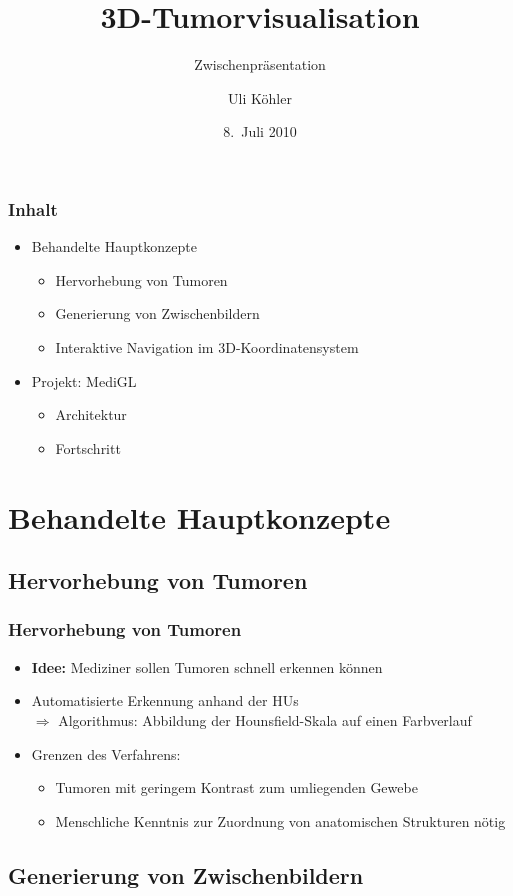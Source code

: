 \documentclass[14pt]{beamer}
\title{3D-Tumorvisualisation}
\subtitle{Zwischenpräsentation}
\author{Uli Köhler}
\institute[EMG]{Ernst-Mach-Gymnasium Haar}
\date{8.~Juli 2010}
\begin{document}
\frame{\titlepage}
\frame{\tableofcontents}
\begin{frame}
   \frametitle{Inhalt}
   \begin{itemize}
    \item  Behandelte Hauptkonzepte
    \begin{itemize}
      \item Hervorhebung von Tumoren
      \item Generierung von Zwischenbildern
      \item Interaktive Navigation im 3D-Koordinatensystem
    \end{itemize}
    \pause
    \item Projekt: MediGL
    \begin{itemize}
     \item Architektur
     \item Fortschritt
    \end{itemize}
   \end{itemize}
\end{frame}
 \section{Behandelte Hauptkonzepte}
\subsection{Hervorhebung von Tumoren}
\begin{frame}[allowframebreaks]
 \frametitle{Hervorhebung von Tumoren}
    \begin{itemize}
     \item \textbf{Idee:} Mediziner sollen Tumoren schnell erkennen können
     \item Automatisierte Erkennung anhand der HUs\\
	  $\Rightarrow$ Algorithmus: Abbildung der Hounsfield-Skala auf einen Farbverlauf
     \item Grenzen des Verfahrens:
      \begin{itemize}
	\item Tumoren mit geringem Kontrast zum umliegenden Gewebe
	\item Menschliche Kenntnis zur Zuordnung von anatomischen Strukturen nötig
      \end{itemize}
    \end{itemize}
\end{frame}
\subsection{Generierung von Zwischenbildern}
\end{document}
